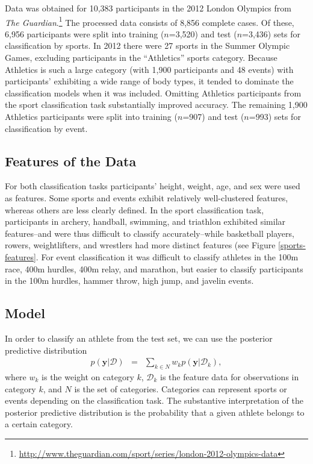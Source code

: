 \documentclass[12pt,letterpaper]{article} %
\begin{document}
Data was obtained for 10,383 participants in the 2012 London Olympics from \textit{The Guardian}.\footnote{\url{http://www.theguardian.com/sport/series/london-2012-olympics-data}} The processed data consists of 8,856 complete cases. Of these, 6,956 participants were split into training ($n$=3,520) and test ($n$=3,436) sets for classification by sports. In 2012 there were 27 sports in the Summer Olympic Games, excluding participants in the ``Athletics'' sports category. Because Athletics is such a large category (with 1,900 participants and 48 events) with participants' exhibiting a wide range of body types, it tended to dominate the classification models when it was included. Omitting Athletics participants from the sport classification task substantially improved accuracy. The remaining 1,900 Athletics participants were split into training ($n$=907) and test ($n$=993) sets for classification by event. 


\subsection{Features of the Data}

For both classification tasks participants' height, weight, age, and sex were used as features. Some sports and events exhibit relatively well-clustered features, whereas others are less clearly defined. In the sport classification task, participants in archery, handball, swimming, and triathlon exhibited similar features--and were thus difficult to classify accurately--while basketball players, rowers, weightlifters, and wrestlers had more distinct features (see Figure \ref{sports-features}. For event classification it was difficult to classify athletes in the 100m race, 400m hurdles, 400m relay, and marathon, but easier to classify participants in the 100m hurdles, hammer throw, high jump, and javelin events. 




\subsection{Model}



In order to classify an athlete from the test set, we can use the posterior predictive distribution
\begin{eqnarray*}
p(\mathbf{y}|\mathcal{D}) &=& \sum_{k \in N} w_k p(\mathbf{y}|\mathcal{D}_k),
\end{eqnarray*}
where $w_k$ is the weight on category $k$, $\mathcal{D}_k$ is the feature data for observations in category $k$, and $N$ is the set of categories. Categories can represent sports or events depending on the classification task. The substantive interpretation of the posterior predictive distribution is the probability that a given athlete belongs to a certain category.
\end{document}
